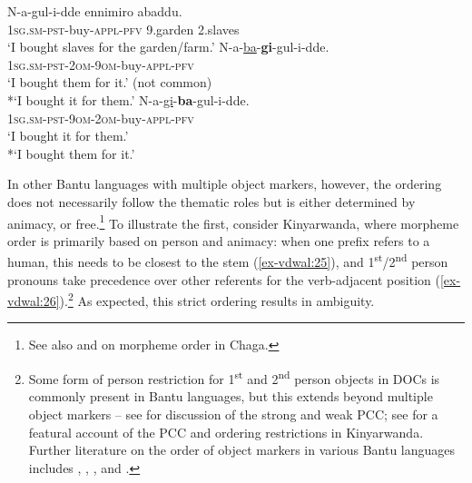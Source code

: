 \documentclass[output=paper
,modfonts
,nonflat]{langsci/langscibook}
\begin{document}
\begin{exe}
\ex \label{ex-vdwal:24}
	\xlist
	\ex
		\gll N-a-gul-i-dde ennimiro abaddu.\\
		\textsc{1sg.sm-pst}-buy-\textsc{appl-pfv} 9.garden 2.slaves\\
		\glt `I bought slaves for the garden/farm.'
	\ex 
		\gll N-a-\uline{ba}-\textbf{gi}-gul-i-dde.\\
		\textsc{1sg.sm-pst-2om-9om}-buy-\textsc{appl-pfv}\\
		\glt `I bought them for it.' (not common)\\
		*`I bought it for them.'
	\ex 	
		\gll N-a-\uline{gi}-\textbf{ba}-gul-i-dde.\\
		\textsc{1sg.sm-pst-9om-2om}-buy-\textsc{appl-pfv}\\
		\glt `I bought it for them.'\\	
		*`I bought them for it.'
	\endxlist
\end{exe}
In other Bantu languages with multiple object markers, however, the ordering does not necessarily follow the thematic roles but is either determined by animacy, or free.\footnote{See also \citet{Bresnan_Moshi1990} and \citet{Alsina1996} on morpheme order in Chaga.} To illustrate the first, consider Kinyarwanda, where morpheme order is primarily based on person and animacy: when one prefix refers to a human, this needs to be closest to the stem (\ref{ex-vdwal:25}), and 1\textsuperscript{st}/2\textsuperscript{nd} person pronouns take precedence over other referents for the verb-adjacent position (\ref{ex-vdwal:26}).\footnote{Some form of person restriction for 1\textsuperscript{st} and 2\textsuperscript{nd} person objects in DOCs is commonly present in Bantu languages, but this extends beyond multiple object markers -- see \citet{Riedel2009} for discussion of the strong and weak PCC; see \citet{Yokoyama2016} for a featural account of the PCC and ordering restrictions in Kinyarwanda. Further literature on the order of object markers in various Bantu languages includes \citet{Duranti1979}, \citet{Bresnan_Moshi1990}, \citet{Rugemalira1993}, and \citet{Alsina1996}.} As expected, this strict ordering results in ambiguity.
\end{document}
